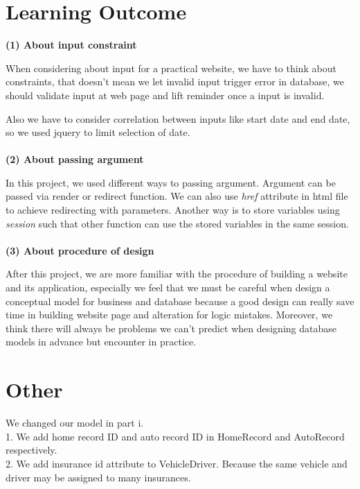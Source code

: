 \documentclass[12pt]{article}
\begin{document}
	\section{Learning Outcome}
	\textbf{(1) About input constraint}\\\par
	When considering about input for a practical website, we have to think about constraints, that doesn't mean we let invalid input trigger error in database, we should validate input at web page and lift reminder once a input is invalid.\\\par
	Also we have to consider correlation between inputs like start date and end date, so we used jquery to limit selection of date.\\\\
	\textbf{(2) About passing argument}\\\par
	In this project, we used different ways to passing argument. Argument can be passed via render or redirect function. We can also use \textit{href} attribute in html file to achieve redirecting with parameters. Another way is to store variables using \textit{session} such that other function can use the stored variables in the same session.\\\\
	\textbf{(3) About procedure of design}\\\par
	After this project, we are more familiar with the procedure of building a website and its application, especially we feel that we must be careful when design a conceptual model for business and database because a good design can really save time in building website page and alteration for logic mistakes.
	Moreover, we think there will always be problems we can't predict when designing database models in advance but encounter in practice.
	
	\section{Other}
	We changed our model in part i.\\
	1. We add home record ID and auto record ID in HomeRecord and AutoRecord respectively.\\
	2. We add insurance id attribute to VehicleDriver. Because the same vehicle and driver may be assigned to many insurances.
	
	
	
\end{document}
